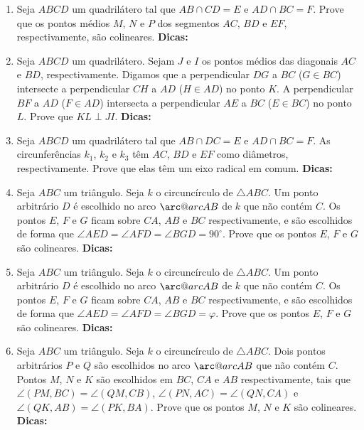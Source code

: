 \documentclass{article}
\makeatletter
\newcommand{\arc@char}{{\usefont{U}{tipa}{m}{n}\symbol{62}}}%
\newcommand{\arc}[1]{\mathpalette\arc@arc{#1}}
\newcommand{\arc@arc}[2]{
	\sbox0{$\m@th#1#2$}%
	\vbox{
		\hbox{\resizebox{\wd0}{\height}{\arc@char}}
		\nointerlineskip
		\box0
	}%
}
\newcommand{\dica}{\textbf{Dicas:}}
\newcommand{\iniTri}{Seja $ABC$ um triângulo}
\makeatother
\begin{document}
\begin{multicols}{2}
\begin{enumerate}
    \item Seja $ABCD$ um quadrilátero tal que $AB\cap CD=E$ e $AD\cap BC=F$. Prove que os pontos médios $M$, $N$ e $P$ dos segmentos $AC$, $BD$ e $EF$, respectivamente, são colineares. \dica %
    
    \item Seja $ABCD$ um quadrilátero. Sejam $J$ e $I$ os pontos médios das diagonais $AC$ e $BD$, respectivamente. Digamos que a perpendicular $DG$ a $BC$ ($G\in BC$) intersecte a perpendicular $CH$ a $AD$ ($H\in AD$) no ponto $K$.  A perpendicular $BF$ a $AD$ ($F\in AD$) intersecta a perpendicular $AE$ a $BC$ ($E\in BC$) no ponto $L$. Prove que $KL\perp JI$. \dica %
    
    \item Seja $ABCD$ um quadrilátero tal que $AB\cap DC=E$ e $AD\cap BC=F$. As circunferências $k_1$, $k_2$ e $k_3$ têm $AC$, $BD$ e $EF$ como diâmetros, respectivamente. Prove que elas têm um eixo radical em comum. \dica %
    
    \item \iniTri. Seja $k$ o circuncírculo de $\triangle ABC$. Um ponto arbitrário $D$ é escolhido no arco $\arc{AB}$ de $k$ que não contém $C$. Os pontos $E$, $F$ e $G$ ficam sobre $CA$, $AB$ e $BC$ respectivamente, e são escolhidos de forma que $\angle AED=\angle AFD=\angle BGD=90^{\circ}$. Prove que os pontos $E$, $F$ e $G$ são colineares. \dica %
    
    \item \iniTri. Seja $k$ o circuncírculo de $\triangle ABC$. Um ponto arbitrário $D$ é escolhido no arco $\arc{AB}$ de $k$ que não contém $C$. Os pontos $E$, $F$ e $G$ ficam sobre $CA$, $AB$ e $BC$ respectivamente, e são escolhidos de forma que $\angle AED=\angle AFD=\angle BGD=\varphi$. Prove que os pontos $E$, $F$ e $G$ são colineares. \dica %
    
    \item \iniTri. Seja $k$ o circuncírculo de $\triangle ABC$. Dois pontos arbitrários $P$ e $Q$ são escolhidos no arco $\arc{AB}$ que não contém $C$. Pontos $M$, $N$ e $K$ são escolhidos em $BC$, $CA$ e $AB$ respectivamente, tais que $\angle(PM, BC)=\angle (QM,CB)$, $\angle (PN,AC)=\angle (QN,CA)$ e $\angle(QK,AB)=\angle(PK,BA)$. Prove que os pontos $M$, $N$ e $K$ são colineares. \dica %
    

\end{enumerate}
\end{multicols}
\end{document}
